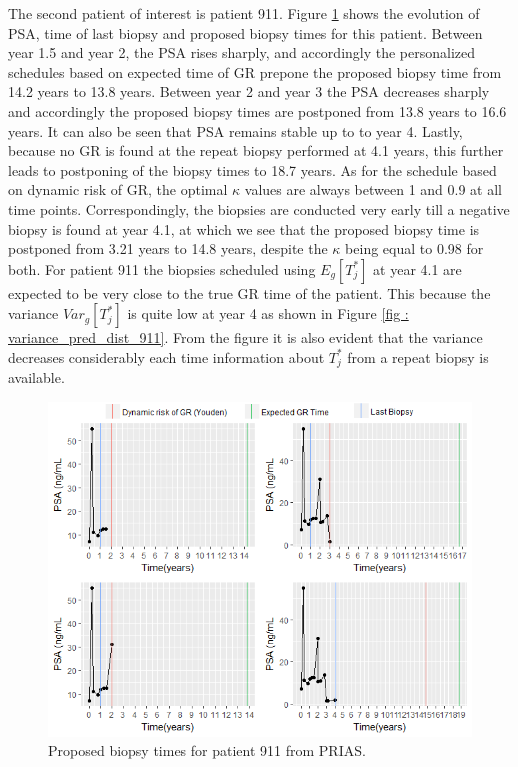 The second patient of interest is patient 911. Figure \ref{fig : prias_demo_pid_911} shows the evolution of PSA, time of last biopsy and proposed biopsy times for this patient. Between year 1.5 and year 2, the PSA rises sharply, and accordingly the personalized schedules based on expected time of GR prepone the proposed biopsy time from 14.2 years to 13.8 years. Between year 2 and year 3 the PSA decreases sharply and accordingly the proposed biopsy times are postponed from 13.8 years to 16.6 years. It can also be seen that PSA remains stable up to to year 4. Lastly, because no GR is found at the repeat biopsy performed at 4.1 years, this further leads to postponing of the biopsy times to 18.7 years. As for the schedule based on dynamic risk of GR, the optimal $\kappa$ values are always between 1 and 0.9 at all time points. Correspondingly, the biopsies are conducted very early till a negative biopsy is found at year 4.1, at which we see that the proposed biopsy time is postponed from 3.21 years to 14.8 years, despite the $\kappa$ being equal to 0.98 for both. For patient 911 the biopsies scheduled using $E_g[T^*_j]$ at year 4.1 are expected to be very close to the true GR time of the patient. This because the variance $Var_g[T^*_j]$ is quite low at year 4 as shown in Figure \ref{fig : variance_pred_dist_911}. From the figure it is also evident that the variance decreases considerably each time information about $T^*_j$ from a repeat biopsy is available.\\

\begin{figure}[!htb]
\centering
\captionsetup{justification=centering}
\includegraphics[width=\textwidth]{images/prias_demo/case_911.png}
\caption{\label{fig : prias_demo_pid_911} Proposed biopsy times for patient 911 from PRIAS.}
\end{figure}

